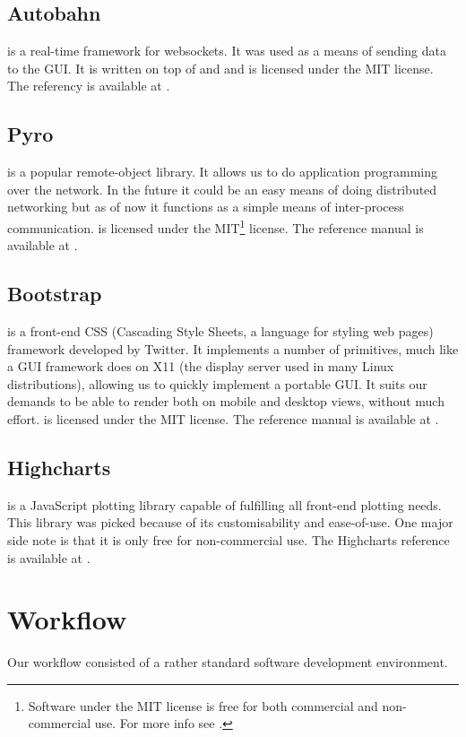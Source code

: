 \documentclass[a4paper, openany, oneside]{memoir}
\begin{document}
\subsection{Autobahn}
\label{sub:autobahn}
 is a real-time framework for websockets. It was used as a means of sending data to the GUI. It is written on top of  and  and is licensed under the MIT license. The referency is available at \cite{autobahn}.

\subsection{Pyro}
\label{sec:pyro}
 is a popular remote-object library. It allows us to do application programming over the network. In the future it could be an easy means of doing distributed networking but as of now it functions as a simple means of inter-process communication.  is licensed under the MIT\footnote{\label{fn:mit}Software under the MIT license is free for both commercial and non-commercial use. For more info see \cite{mitlic}.} license. The reference manual is available at \cite{pyro4}.

\subsection{Bootstrap}
\label{sec:bootstrap}
 is a front-end CSS (Cascading Style Sheets, a language for styling web pages) framework developed by Twitter. It implements a number of primitives, much like a GUI framework does on X11 (the display server used in many Linux distributions), allowing us to quickly implement a portable GUI. It suits our demands to be able to render both on mobile and desktop views, without much effort.  is licensed under the MIT license. The reference manual is available at \cite{bootstrap}.

\subsection{Highcharts}
\label{sec:highcharts}
 is a JavaScript plotting library capable of fulfilling all front-end plotting needs. This library was picked because of its customisability and ease-of-use. One major side note is that it is only free for non-commercial use. The Highcharts reference is available at \cite{highcharts}.

\section{Workflow}
\label{sec:workflow}
Our workflow consisted of a rather standard software development environment.
\end{document}

